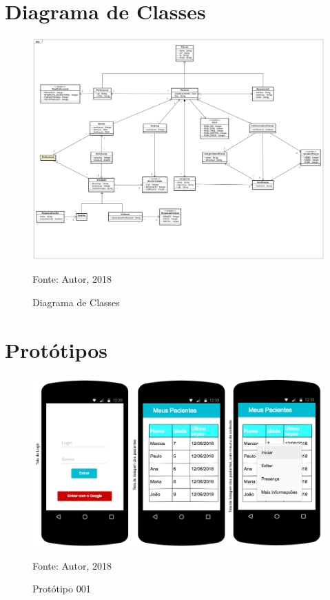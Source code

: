 \documentclass[
	12pt,				%
	openright,			%
	oneside,			%
	a4paper,			%
	english,			%
	brazil				%
	]{abntex2}
\theoremstyle{theorem}
\theoremstyle{definition}
\begin{document}
\chapter{Diagrama de Classes}  \label{classescap}
		\begin{figure}[H]
			\centering
			\includegraphics[width=1\linewidth]{img/diagramaclasses}
			\caption{Diagrama de Classes}
			Fonte: Autor, 2018
			\label{classes}
	\end{figure}
\chapter{Protótipos}  \label{prototiposcap}
		\begin{figure}[H]
			\centering
			\includegraphics[width=1\linewidth]{img/telaloginlistapacientes}
			\caption{Protótipo 001}
			Fonte: Autor, 2018
			\label{p001}
		\end{figure}
\end{document}
